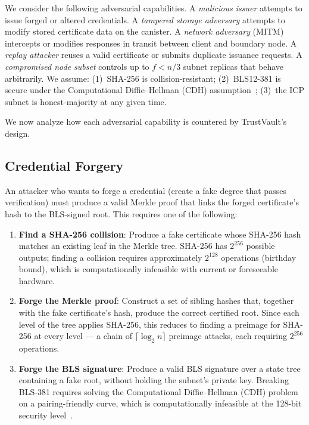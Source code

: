 \documentclass[journal]{IEEEtran}
\begin{document}
We consider the following adversarial capabilities. A \emph{malicious issuer} attempts to issue forged or altered credentials. A \emph{tampered storage adversary} attempts to modify stored certificate data on the canister. A \emph{network adversary} (MITM) intercepts or modifies responses in transit between client and boundary node. A \emph{replay attacker} reuses a valid certificate or submits duplicate issuance requests. A \emph{compromised node subset} controls up to $f < n/3$ subnet replicas that behave arbitrarily. We assume: (1)~SHA-256 is collision-resistant; (2)~BLS12-381 is secure under the Computational Diffie--Hellman (CDH) assumption~\cite{boneh2001bls}; (3)~the ICP subnet is honest-majority at any given time.

We now analyze how each adversarial capability is countered by TrustVault's design.

\subsection{Credential Forgery}

An attacker who wants to forge a credential (create a fake degree that passes verification) must produce a valid Merkle proof that links the forged certificate's hash to the BLS-signed root. This requires one of the following:

\begin{enumerate}
  \item \textbf{Find a SHA-256 collision}: Produce a fake certificate whose SHA-256 hash matches an existing leaf in the Merkle tree. SHA-256 has $2^{256}$ possible outputs; finding a collision requires approximately $2^{128}$ operations (birthday bound), which is computationally infeasible with current or foreseeable hardware.
  \item \textbf{Forge the Merkle proof}: Construct a set of sibling hashes that, together with the fake certificate's hash, produce the correct certified root. Since each level of the tree applies SHA-256, this reduces to finding a preimage for SHA-256 at every level — a chain of $\lceil\log_2 n\rceil$ preimage attacks, each requiring $2^{256}$ operations.
  \item \textbf{Forge the BLS signature}: Produce a valid BLS signature over a state tree containing a fake root, without holding the subnet's private key. Breaking BLS-381 requires solving the Computational Diffie--Hellman (CDH) problem on a pairing-friendly curve, which is computationally infeasible at the 128-bit security level~\cite{boneh2001bls}.
\end{enumerate}
\end{document}

